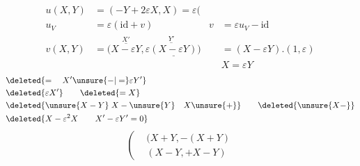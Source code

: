 \[
\begin{aligned}
u(X,Y)&=(-Y+2\varepsilon X,X)=\varepsilon(\\
u_V&=\varepsilon(\mathrm{id}+v) &v&=\varepsilon u_V-\mathrm{id}\\
v(X,Y)&=\big(\overset{X'}{\overline{X-\varepsilon Y}},\overset{Y'}{\overline{\varepsilon\underline{(X-\varepsilon Y)}}}\big)
& &=(X-\varepsilon Y).(1,\varepsilon)\\
&&&X=\varepsilon Y
\end{aligned}
\]
\[
\begin{aligned}
&\deleted{=\quad X'\unsure{-|=}\varepsilon Y'}\\
&\deleted{\varepsilon X'}\qquad\deleted{=X}\\
&\deleted{\unsure{X-Y}\;X-\unsure{Y}\quad X\unsure{+}}\qquad\deleted{\unsure{X-}}\\
&\deleted{X-\varepsilon^2X\qquad X'-\varepsilon Y'=0}
\end{aligned}
\]
\[
\left(\begin{aligned}
&(X+Y,-(X+Y)\\
&(X-Y,+X-Y)
\end{aligned}\right.
\]

